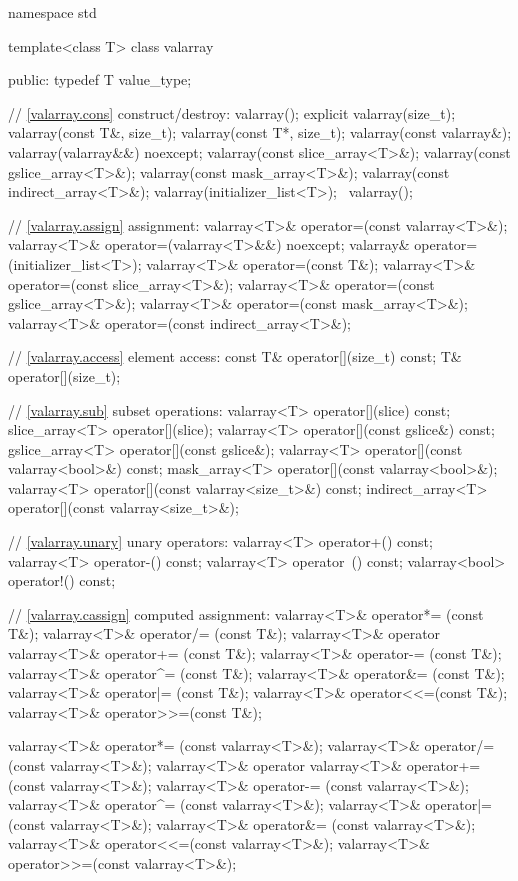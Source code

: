 %
\begin{codeblock}
namespace std {
  template<class T> class valarray {
  public:
    typedef T value_type;

    // \ref{valarray.cons} construct/destroy:
    valarray();
    explicit valarray(size_t);
    valarray(const T&, size_t);
    valarray(const T*, size_t);
    valarray(const valarray&);
    valarray(valarray&&) noexcept;
    valarray(const slice_array<T>&);
    valarray(const gslice_array<T>&);
    valarray(const mask_array<T>&);
    valarray(const indirect_array<T>&);
    valarray(initializer_list<T>);
    ~valarray();

    // \ref{valarray.assign} assignment:
    valarray<T>& operator=(const valarray<T>&);
    valarray<T>& operator=(valarray<T>&&) noexcept;
    valarray& operator=(initializer_list<T>);
    valarray<T>& operator=(const T&);
    valarray<T>& operator=(const slice_array<T>&);
    valarray<T>& operator=(const gslice_array<T>&);
    valarray<T>& operator=(const mask_array<T>&);
    valarray<T>& operator=(const indirect_array<T>&);

    // \ref{valarray.access} element access:
    const T&          operator[](size_t) const;
    T&                operator[](size_t);

    // \ref{valarray.sub} subset operations:
    valarray<T>       operator[](slice) const;
    slice_array<T>    operator[](slice);
    valarray<T>       operator[](const gslice&) const;
    gslice_array<T>   operator[](const gslice&);
    valarray<T>       operator[](const valarray<bool>&) const;
    mask_array<T>     operator[](const valarray<bool>&);
    valarray<T>       operator[](const valarray<size_t>&) const;
    indirect_array<T> operator[](const valarray<size_t>&);

    // \ref{valarray.unary} unary operators:
    valarray<T> operator+() const;
    valarray<T> operator-() const;
    valarray<T> operator~() const;
    valarray<bool> operator!() const;

    // \ref{valarray.cassign} computed assignment:
    valarray<T>& operator*= (const T&);
    valarray<T>& operator/= (const T&);
    valarray<T>& operator%
    valarray<T>& operator+= (const T&);
    valarray<T>& operator-= (const T&);
    valarray<T>& operator^= (const T&);
    valarray<T>& operator&= (const T&);
    valarray<T>& operator|= (const T&);
    valarray<T>& operator<<=(const T&);
    valarray<T>& operator>>=(const T&);

    valarray<T>& operator*= (const valarray<T>&);
    valarray<T>& operator/= (const valarray<T>&);
    valarray<T>& operator%
    valarray<T>& operator+= (const valarray<T>&);
    valarray<T>& operator-= (const valarray<T>&);
    valarray<T>& operator^= (const valarray<T>&);
    valarray<T>& operator|= (const valarray<T>&);
    valarray<T>& operator&= (const valarray<T>&);
    valarray<T>& operator<<=(const valarray<T>&);
    valarray<T>& operator>>=(const valarray<T>&);

}}
\end{codeblock}
